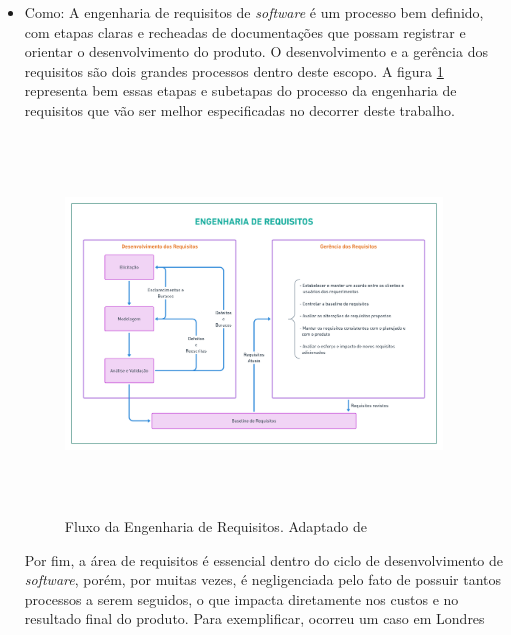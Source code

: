 \begin{itemize}
    \item Como: A engenharia de requisitos de \textit{software} é um processo bem definido, com etapas claras e recheadas de documentações que possam registrar e orientar o desenvolvimento do produto. O desenvolvimento e a gerência dos requisitos são dois grandes processos dentro deste escopo. A figura \ref{eng_req_flux} representa bem essas etapas e subetapas do processo da engenharia de requisitos que vão ser melhor especificadas no decorrer deste trabalho.
    
    \begin{figure}[htb]
        \begin{center}
            \includegraphics[width=10cm,height=10cm,keepaspectratio]{figuras/Introducao/eng_req_fluxo.png}
            \caption{{Fluxo da Engenharia de Requisitos. Adaptado de \cite{westfall_5w2h}}}
            \label{eng_req_flux}
        \end{center}
    \end{figure}
    
    Por fim, a área de requisitos é essencial dentro do ciclo de desenvolvimento de \textit{software}, porém, por muitas vezes, é negligenciada pelo fato de possuir tantos processos a serem seguidos, o que impacta diretamente nos custos e no resultado final do produto. Para exemplificar, ocorreu um caso em Londres 
    
\end{itemize}
